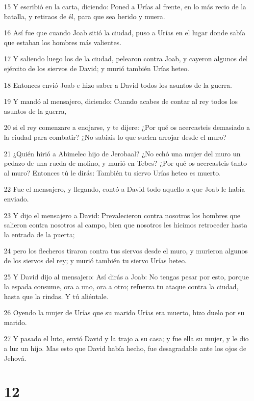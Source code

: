 \par 15 Y escribió en la carta, diciendo: Poned a Urías al frente, en lo más recio de la batalla, y retiraos de él, para que sea herido y muera.
\par 16 Así fue que cuando Joab sitió la ciudad, puso a Urías en el lugar donde sabía que estaban los hombres más valientes.
\par 17 Y saliendo luego los de la ciudad, pelearon contra Joab, y cayeron algunos del ejército de los siervos de David; y murió también Urías heteo.
\par 18 Entonces envió Joab e hizo saber a David todos los asuntos de la guerra.
\par 19 Y mandó al mensajero, diciendo: Cuando acabes de contar al rey todos los asuntos de la guerra,
\par 20 si el rey comenzare a enojarse, y te dijere: ¿Por qué os acercasteis demasiado a la ciudad para combatir? ¿No sabíais lo que suelen arrojar desde el muro?
\par 21 ¿Quién hirió a Abimelec hijo de Jerobaal? ¿No echó una mujer del muro un pedazo de una rueda de molino, y murió en Tebes? ¿Por qué os acercasteis tanto al muro? Entonces tú le dirás: También tu siervo Urías heteo es muerto.
\par 22 Fue el mensajero, y llegando, contó a David todo aquello a que Joab le había enviado.
\par 23 Y dijo el mensajero a David: Prevalecieron contra nosotros los hombres que salieron contra nosotros al campo, bien que nosotros les hicimos retroceder hasta la entrada de la puerta;
\par 24 pero los flecheros tiraron contra tus siervos desde el muro, y murieron algunos de los siervos del rey; y murió también tu siervo Urías heteo.
\par 25 Y David dijo al mensajero: Así dirás a Joab: No tengas pesar por esto, porque la espada consume, ora a uno, ora a otro; refuerza tu ataque contra la ciudad, hasta que la rindas. Y tú aliéntale.
\par 26 Oyendo la mujer de Urías que su marido Urías era muerto, hizo duelo por su marido.
\par 27 Y pasado el luto, envió David y la trajo a su casa; y fue ella su mujer, y le dio a luz un hijo. Mas esto que David había hecho, fue desagradable ante los ojos de Jehová.

\chapter{12}

